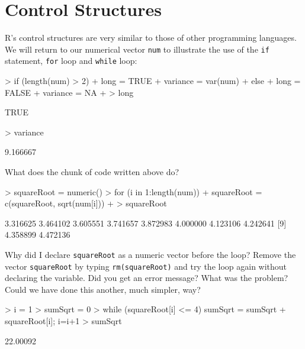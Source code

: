\documentclass[12pt]{article}
\newcommand{\code}[1]{{\texttt{#1}}}
\begin{document}
\section{Control Structures}

R's control structures are very similar to those of other programming languages.  We will return to our numerical vector \code{num} to illustrate the use of the \code{if} statement, \code{for} loop and \code{while} loop:

\begin{Schunk}
\begin{Sinput}
> if (length(num) > 2) {
+ long = TRUE
+ variance = var(num)
+ } else {
+ long = FALSE
+ variance = NA
+ }
> long
\end{Sinput}
\begin{Soutput}
[1] TRUE
\end{Soutput}
\begin{Sinput}
> variance
\end{Sinput}
\begin{Soutput}
[1] 9.166667
\end{Soutput}
\end{Schunk}

What does the chunk of code written above do?

\begin{Schunk}
\begin{Sinput}
> squareRoot = numeric()
> for (i in 1:length(num)) {
+ squareRoot = c(squareRoot, sqrt(num[i]))
+ }
> squareRoot
\end{Sinput}
\begin{Soutput}
 [1] 3.316625 3.464102 3.605551 3.741657 3.872983 4.000000 4.123106 4.242641
 [9] 4.358899 4.472136
\end{Soutput}
\end{Schunk}

Why did I declare \code{squareRoot} as a numeric vector before the loop?  Remove the vector \code{squareRoot} by typing \code{rm(squareRoot)} and try the loop again without declaring the variable.  Did you get an error message?  What was the problem?  Could we have done this another, much simpler, way?

\begin{Schunk}
\begin{Sinput}
> i = 1
> sumSqrt = 0
> while (squareRoot[i] <= 4) {sumSqrt = sumSqrt + squareRoot[i]; i=i+1}
> sumSqrt
\end{Sinput}
\begin{Soutput}
[1] 22.00092
\end{Soutput}
\end{Schunk}
\end{document}
